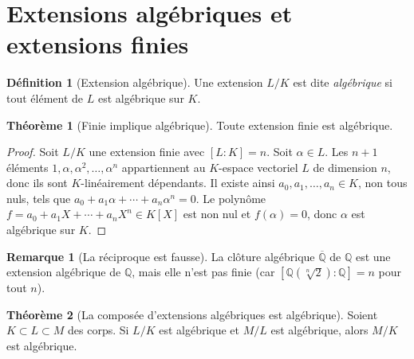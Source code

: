 \documentclass[12pt,a4paper,openany]{book}
\theoremstyle{definition}
\newtheorem{definition}{Définition}[chapter]
\newtheorem{theoreme}{Théorème}[chapter]
\newtheorem{remarque}{Remarque}[chapter]
\newcommand{\Q}{\mathbb{Q}}
\begin{document}
\section{Extensions algébriques et extensions finies}
\label{sec:ext-algebriques}

\begin{definition}[Extension algébrique]\label{def:ext-algebrique}
Une extension $L/K$ est dite \emph{algébrique} si tout élément de $L$ est
algébrique sur $K$.
\end{definition}

\begin{theoreme}[Finie implique algébrique]\label{thm:finie-implique-algebrique}
Toute extension finie est algébrique.
\end{theoreme}

\begin{proof}
Soit $L/K$ une extension finie avec $[L:K] = n$. Soit $\alpha \in L$. Les
$n+1$ éléments $1, \alpha, \alpha^2, \dots, \alpha^n$ appartiennent au $K$-espace
vectoriel $L$ de dimension $n$, donc ils sont $K$-linéairement dépendants. Il
existe ainsi $a_0, a_1, \dots, a_n \in K$, non tous nuls, tels que
$a_0 + a_1\alpha + \cdots + a_n\alpha^n = 0$. Le polynôme
$f = a_0 + a_1 X + \cdots + a_n X^n \in K[X]$ est non nul et $f(\alpha) = 0$,
donc $\alpha$ est algébrique sur $K$.
\end{proof}

\begin{remarque}[La réciproque est fausse]
\label{rem:algebrique-pas-finie}
La clôture algébrique $\overline{\Q}$ de $\Q$ est une extension algébrique de
$\Q$, mais elle n'est pas finie (car $[\Q(\sqrt[n]{2}):\Q] = n$ pour tout $n$).
\end{remarque}

\begin{theoreme}[La composée d'extensions algébriques est algébrique]
\label{thm:algebrique-algebrique}
Soient $K \subset L \subset M$ des corps. Si $L/K$ est algébrique et $M/L$
est algébrique, alors $M/K$ est algébrique.
\end{theoreme}
\end{document}
